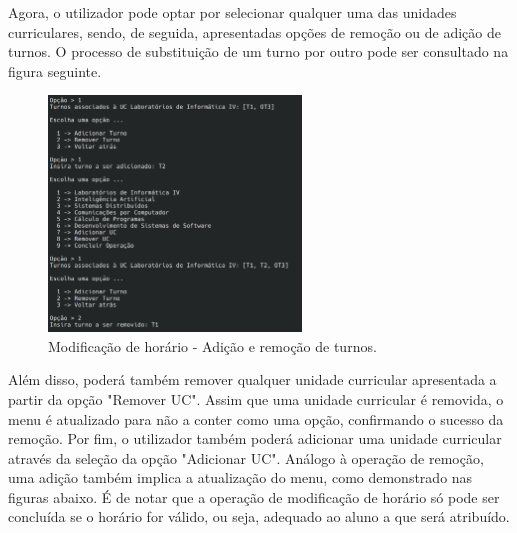 \documentclass[12pt, a4paper]{article}
\begin{document}
Agora, o utilizador pode optar por selecionar qualquer uma das unidades curriculares, sendo, de
seguida, apresentadas opções de remoção ou de adição de turnos. O processo de substituição de um
turno por outro pode ser consultado na figura seguinte.

\begin{figure}[H]
    \centering
    \includegraphics[width=0.6\textwidth]{Imagens/Manual/DiretorCurso-6-1.png}
    \caption{Modificação de horário - Adição e remoção de turnos.}
\end{figure}

Além disso, poderá também remover qualquer unidade curricular apresentada a partir da opção
"Remover UC". Assim que uma unidade curricular é removida, o menu é atualizado para não a conter
como uma opção, confirmando o sucesso da remoção. Por fim, o utilizador também poderá adicionar uma
unidade curricular através da seleção da opção "Adicionar UC". Análogo à operação de remoção, uma
adição também implica a atualização do menu, como demonstrado nas figuras abaixo. É de notar que a
operação de modificação de horário só pode ser concluída se o horário for válido, ou seja, adequado
ao aluno a que será atribuído.
\end{document}
